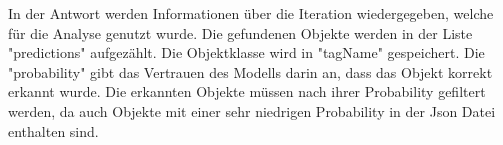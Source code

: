 In der Antwort werden Informationen über die Iteration wiedergegeben, welche für die Analyse genutzt wurde. Die gefundenen Objekte werden in der Liste "predictions" aufgezählt. Die Objektklasse wird in "tagName" gespeichert. Die "probability" gibt das Vertrauen des Modells darin an, dass das Objekt korrekt erkannt wurde. Die erkannten Objekte müssen nach ihrer Probability gefiltert werden, da auch Objekte mit einer sehr niedrigen Probability in der Json Datei enthalten sind. 